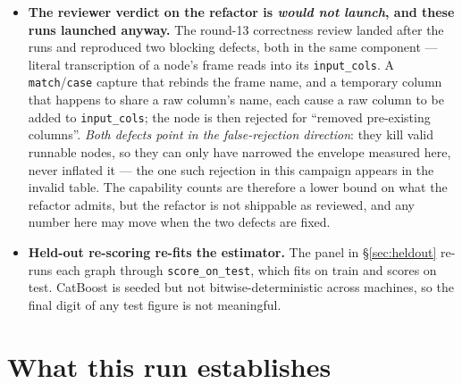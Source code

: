 \documentclass[11pt]{article}
\begin{document}
\begin{itemize}
framework result; that they \emph{win} is a statement about california.
\item \textbf{The reviewer verdict on the refactor is \emph{would not launch}, and these
runs launched anyway.} The round-13 correctness review landed after the runs and reproduced
two blocking defects, both in the same component --- literal transcription of a node's frame
reads into its \texttt{input\_cols}. A \texttt{match}/\texttt{case} capture that rebinds the
frame name, and a temporary column that happens to share a raw column's name, each cause a
raw column to be added to \texttt{input\_cols}; the node is then rejected for ``removed
pre-existing columns''. \emph{Both defects point in the false-rejection direction}: they kill
valid runnable nodes, so they can only have narrowed the envelope measured here, never
inflated it --- the one such rejection in this campaign appears in the invalid table. The
capability counts are therefore a lower bound on what the refactor admits, but the refactor
is not shippable as reviewed, and any number here may move when the two defects are fixed.
\item \textbf{Held-out re-scoring re-fits the estimator.} The panel in
\S\ref{sec:heldout} re-runs each graph through \texttt{score\_on\_test}, which fits on train
and scores on test. CatBoost is seeded but not bitwise-deterministic across machines, so the
final digit of any test figure is not meaningful.
\end{itemize}

\section{What this run establishes}
\end{document}
